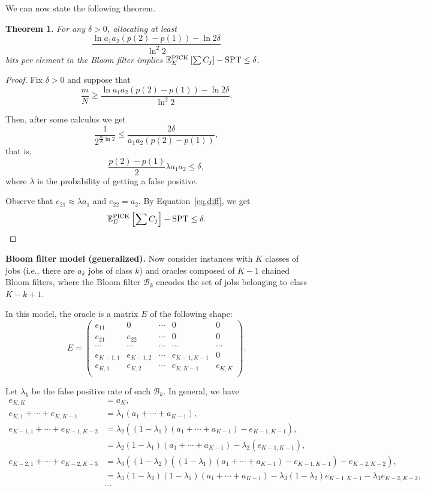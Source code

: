 \documentclass{article}
\newtheorem{theorem}{Theorem}
\begin{document}
We can now state the following theorem.

\begin{theorem}
    For any \(\delta>0\), allocating at least
    \[
        \frac{\ln a_1a_2(p(2)-p(1))-\ln 2\delta}{\ln^2 2}
    \]
    bits per element in the Bloom filter implies \(\mathbb{E}_E^{\text{PICK}}\left[\sum C_j\right]-\text{SPT}\le\delta\).
\end{theorem}
\begin{proof}
    Fix \(\delta>0\) and suppose that
    \[
        \frac{m}{N}\ge\frac{\ln a_1a_2(p(2)-p(1))-\ln 2\delta}{\ln^2 2}.
    \]

    Then, after some calculus we get
    \[
        \frac{1}{2^{\frac{m}{N}\ln 2}}\le\frac{2\delta}{a_1a_2(p(2)-p(1))},
    \]
    that is,
    \[
        \frac{p(2)-p(1)}{2}\lambda a_1a_2\le\delta,
    \]
    where \(\lambda\) is the probability of getting a false positive.

    Observe that \(e_{21}\approx\lambda a_1\) and \(e_{22}=a_2\).
    By Equation~\ref{eq.diff}, we get
    \[
        \mathbb{E}_E^{\text{PICK}}\left[\sum C_j\right]-\text{SPT}\le\delta.
    \]
\end{proof}

\noindent\textbf{Bloom filter model (generalized).}
Now consider instances with \(K\) classes of jobs (i.e., there are \(a_k\) jobs of class \(k\)) and oracles composed of \(K-1\) chained Bloom filters, where the Bloom filter \(\mathcal{B}_k\) encodes the set of jobs belonging to class \(K-k+1\).

In this model, the oracle is a matrix \(E\) of the following shape:
\[
    E=\begin{pmatrix}
        e_{11} & 0      & \cdots & 0 & 0 \\
        e_{21} & e_{22} & \cdots & 0 & 0 \\
        \cdots & \cdots & \cdots & \cdots & \cdots \\
        e_{K-1,1} & e_{K-1,2} & \cdots & e_{K-1,K-1} & 0 \\
        e_{K,1}   & e_{K,2}   & \cdots & e_{K,K-1}   & e_{K,K} \\
    \end{pmatrix}.
\]

Let \(\lambda_k\) be the false positive rate of each \(\mathcal{B}_k\).
In general, we have
\begin{align*}
    e_{K,K}&=a_K, \\
    e_{K,1}+\cdots+e_{K,K-1}&=\lambda_1(a_1+\cdots+a_{K-1}), \\
    e_{K-1,1}+\cdots+e_{K-1,K-2}&=\lambda_2((1-\lambda_1)(a_1+\cdots+a_{K-1})-e_{K-1,K-1}), \\
    &=\lambda_2(1-\lambda_1)(a_1+\cdots+a_{K-1})-\lambda_2(e_{K-1,K-1}), \\
    e_{K-2,1}+\cdots+e_{K-2,K-3}&=\lambda_3((1-\lambda_2)((1-\lambda_1)(a_1+\cdots+a_{K-1})-e_{K-1,K-1})-e_{K-2,K-2}), \\
    &=\lambda_3(1-\lambda_2)(1-\lambda_1)(a_1+\cdots+a_{K-1})-\lambda_3(1-\lambda_2)e_{K-1,K-1}-\lambda_3e_{K-2,K-2}, \\
    &\cdots \\
\end{align*}
\end{document}
